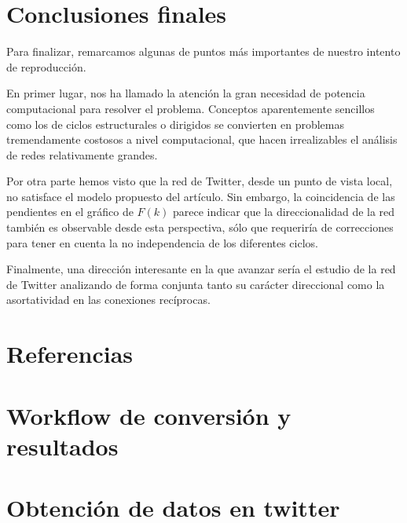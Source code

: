 \documentclass[1p]{elsarticle}
\begin{document}
\section{Conclusiones finales}
    Para finalizar, remarcamos algunas de puntos más importantes de nuestro intento de reproducción.

    En primer lugar, nos ha llamado la atención la gran necesidad de potencia computacional para resolver el problema. 
    Conceptos aparentemente sencillos como los de ciclos estructurales o dirigidos se convierten en problemas tremendamente costosos a nivel computacional, que hacen irrealizables el análisis de redes relativamente grandes.

    Por otra parte hemos visto que la red de Twitter, desde un punto de vista local, no satisface el modelo propuesto del artículo. Sin embargo, la coincidencia de las pendientes en el gráfico de $F(k)$ parece indicar que la direccionalidad de la red también es observable desde esta perspectiva, sólo que requeriría de correcciones para tener en cuenta la no independencia de los diferentes ciclos.

    Finalmente, una dirección interesante en la que avanzar sería el estudio de la red de Twitter analizando de forma conjunta tanto su carácter direccional como la asortatividad en las conexiones recíprocas.

\section*{Referencias}


\begin{appendices}
	
	\section{Workflow de conversión y resultados}
	
\pagebreak
\section{Obtención de datos en twitter}

\end{appendices}
\end{document}
